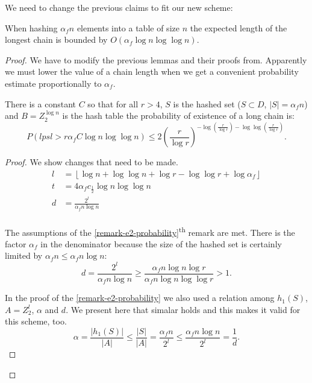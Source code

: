 We need to change the previous claims to fit our new scheme: 
\begin{theorem}
\label{theorem-n-to-n}
When hashing $\alpha_f n$ elements into a table of size $n$ the expected length of the longest chain is bounded by $O(\alpha_f \log n \log \log n)$.
\end{theorem}
\begin{proof}
We have to modify the previous lemmas and their proofs from. Apparently we must lower the value of a chain length when we get a convenient probability estimate proportionally to $\alpha_f$. 

\begin{remark}
There is a constant $C$ so that for all $r > 4$, $S$ is the hashed set ($S \subset D$, $|S| = \alpha_f n$) and $B = Z_2^{\log n}$ is the hash table the probability of existence of a long chain is:
\begin{displaymath}
P(lpsl > r \alpha_f C \log n \log \log n) \leq 2 \left(\frac{r}{\log r}\right)^{-\log \left(\frac{r}{\log r}\right) - \log \log \left(\frac{r}{\log r}\right)}\textit{.}
\end{displaymath}
\end{remark}
\begin{proof}
We show changes that need to be made. 
\begin{displaymath}
\begin{split}
l & = \left\lfloor \log n + \log \log n + \log r - \log \log r + \log \alpha_f \right\rfloor \\
t & = 4\alpha_f c_{\frac{1}{2}} \log n \log \log n \\
d & = \frac{2^l}{\alpha_f n \log n} \\
\end{split}
\end{displaymath}

The assumptions of the \ref{remark-e2-probability}\textsuperscript{th} remark are met. There is the factor $\alpha_f$ in the denominator because the size of the hashed set is certainly limited by $\alpha_f n \leq \alpha_f n \log n$:
\begin{displaymath}
d = \frac{2^l}{\alpha_f n \log n} \geq \frac{\alpha_f n \log n \log r}{\alpha_f n \log n \log \log r} > 1 \textit{.}
\end{displaymath}

In the proof of the \ref{remark-e2-probability} we also used a relation among $h_1(S)$, $A = Z_2^l$, $\alpha$ and $d$. We present here that simalar holds and this makes it valid for this scheme, too.
\begin{displaymath}
\alpha = \frac{|h_1(S)|}{|A|}\leq \frac{|S|}{|A|} = \frac{\alpha_f n}{2^l} \leq \frac{\alpha_f n \log n}{2^l} = \frac{1}{d} \textit{.}
\end{displaymath}


\end{proof}
\end{proof}
